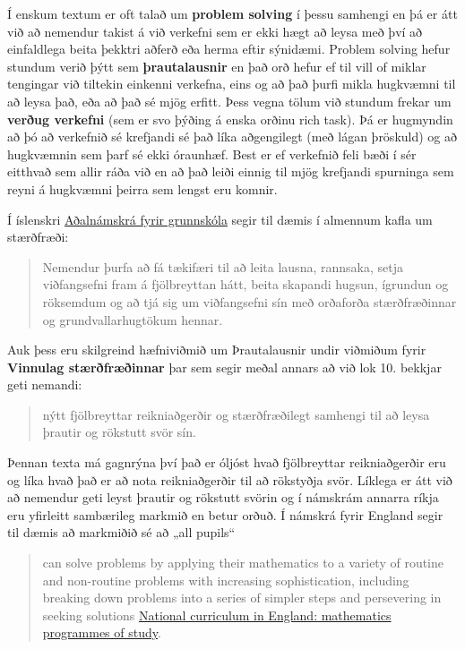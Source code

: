 \documentclass[
  icelandic,
]{book}
\theoremstyle{definition}
\theoremstyle{definition}
\theoremstyle{definition}
\theoremstyle{definition}
\theoremstyle{remark}
\begin{document}
Í enskum textum er oft talað um \textbf{problem solving} í þessu samhengi en þá er átt við að nemendur takist á við verkefni sem er ekki hægt að leysa með því að einfaldlega beita þekktri aðferð eða herma eftir sýnidæmi. Problem solving hefur stundum verið þýtt sem \textbf{þrautalausnir} en það orð hefur ef til vill of miklar tengingar við tiltekin einkenni verkefna, eins og að það þurfi mikla hugkvæmni til að leysa það, eða að það sé mjög erfitt. Þess vegna tölum við stundum frekar um \textbf{verðug verkefni} (sem er svo þýðing á enska orðinu rich task). Þá er hugmyndin að þó að verkefnið sé krefjandi sé það líka aðgengilegt (með lágan þröskuld) og að hugkvæmnin sem þarf sé ekki óraunhæf. Best er ef verkefnið feli bæði í sér eitthvað sem allir ráða við en að það leiði einnig til mjög krefjandi spurninga sem reyni á hugkvæmni þeirra sem lengst eru komnir.

Í íslenskri \href{https://www.adalnamskra.is/grunnskoli/kafli-25-staerdfraedi-2024}{Aðalnámskrá fyrir grunnskóla} segir til dæmis í almennum kafla um stærðfræði:

\begin{quote}
Nemendur þurfa að fá tækifæri til að leita lausna, rannsaka, setja viðfangsefni fram á fjölbreyttan hátt, beita skapandi hugsun, ígrundun og röksemdum og að tjá sig um viðfangsefni sín með orðaforða stærðfræðinnar og grundvallarhugtökum hennar.
\end{quote}

Auk þess eru skilgreind hæfniviðmið um Þrautalausnir undir viðmiðum fyrir \textbf{Vinnulag stærðfræðinnar} þar sem segir meðal annars að við lok 10. bekkjar geti nemandi:

\begin{quote}
nýtt fjölbreyttar reikniaðgerðir og stærðfræðilegt samhengi til að leysa þrautir og rökstutt svör sín.
\end{quote}

Þennan texta má gagnrýna því það er óljóst hvað fjölbreyttar reikniaðgerðir eru og líka hvað það er að nota reikniaðgerðir til að rökstyðja svör. Líklega er átt við að nemendur geti leyst þrautir og rökstutt svörin og í námskrám annarra ríkja eru yfirleitt sambærileg markmið en betur orðuð. Í námskrá fyrir England segir til dæmis að markmiðið sé að „all pupils``

\begin{quote}
can solve problems by applying their mathematics to a variety of routine and non-routine problems with increasing sophistication, including breaking down problems into a series of simpler steps and persevering in seeking solutions \href{https://www.gov.uk/government/publications/national-curriculum-in-england-mathematics-programmes-of-study/national-curriculum-in-england-mathematics-programmes-of-study}{National curriculum in England: mathematics programmes of study}.
\end{quote}
\end{document}
